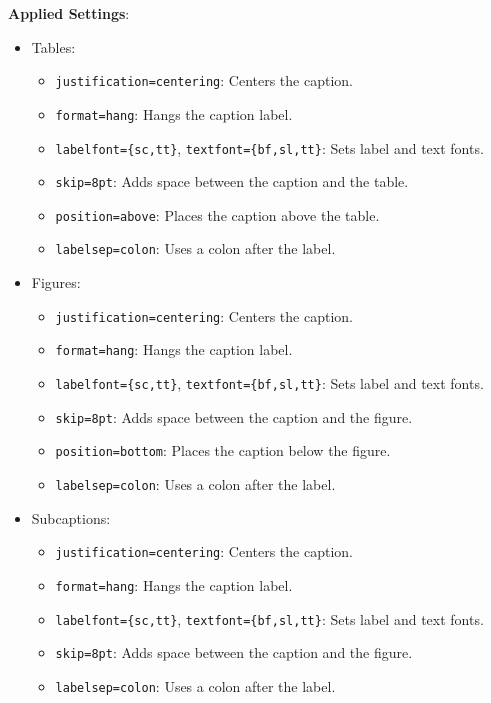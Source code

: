 \documentclass[12pt,twoside]{report}
\begin{document}
\textbf{Applied Settings}:
\begin{itemize}
    \item Tables:
    \begin{itemize}
        \item \texttt{justification=centering}: Centers the caption.
        \item \texttt{format=hang}: Hangs the caption label.
        \item \texttt{labelfont=\{sc,tt\}}, \texttt{textfont=\{bf,sl,tt\}}: Sets label and text fonts.
        \item \texttt{skip=8pt}: Adds space between the caption and the table.
        \item \texttt{position=above}: Places the caption above the table.
        \item \texttt{labelsep=colon}: Uses a colon after the label.
    \end{itemize}
    \item Figures:
    \begin{itemize}
        \item \texttt{justification=centering}: Centers the caption.
        \item \texttt{format=hang}: Hangs the caption label.
        \item \texttt{labelfont=\{sc,tt\}}, \texttt{textfont=\{bf,sl,tt\}}: Sets label and text fonts.
        \item \texttt{skip=8pt}: Adds space between the caption and the figure.
        \item \texttt{position=bottom}: Places the caption below the figure.
        \item \texttt{labelsep=colon}: Uses a colon after the label.
    \end{itemize}
    \item Subcaptions:
    \begin{itemize}
        \item \texttt{justification=centering}: Centers the caption.
        \item \texttt{format=hang}: Hangs the caption label.
        \item \texttt{labelfont=\{sc,tt\}}, \texttt{textfont=\{bf,sl,tt\}}: Sets label and text fonts.
        \item \texttt{skip=8pt}: Adds space between the caption and the figure.
        \item \texttt{labelsep=colon}: Uses a colon after the label.
    \end{itemize}
\end{itemize}
\end{document}
